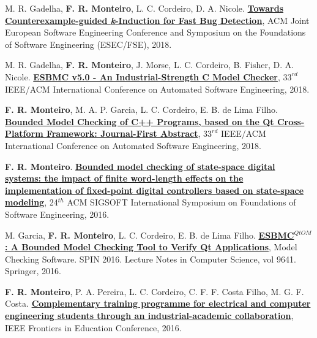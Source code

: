 \documentclass[letterpaper]{article}
\renewenvironment{itemize}{
  \begin{list}{}{
    \setlength{\leftmargin}{1.5em}
  }
}{
  \end{list}
}
\begin{document}
\begin{itemize}
    
    \item M. R. Gadelha, {\bf F. R. Monteiro}, L. C. Cordeiro, D. A. Nicole. \href{https://ssvlab.github.io/lucasccordeiro/papers/fse2018.pdf}{{\bf Towards Counterexample-guided {\emph k}-Induction for Fast Bug Detection}},
   ACM Joint European Software Engineering Conference and Symposium on the Foundations of Software Engineering (ESEC/FSE), 2018.
  
    \item M. R. Gadelha, {\bf F. R. Monteiro}, J. Morse, L. C. Cordeiro, B. Fisher, D. A. Nicole. \href{https://ssvlab.github.io/lucasccordeiro/papers/ase2018.pdf}{{\bf ESBMC v5.0 - An Industrial-Strength C Model Checker}},
  $33^{rd}$ IEEE/ACM International Conference on Automated Software Engineering, 2018.  
        
    \item {\bf F. R. Monteiro}, M. A. P. Garcia, L. C. Cordeiro, E. B. de Lima Filho. \href{https://www.researchgate.net/publication/326657978_Bounded_Model_Checking_of_C_Programs_based_on_the_Qt_Cross-Platform_Framework_Journal-First_Abstract}{{\bf Bounded Model Checking of C++ Programs, based on the Qt Cross-Platform Framework: Journal-First Abstract}},
  $33^{rd}$ IEEE/ACM International Conference on Automated Software Engineering, 2018.  
  
    \item {\bf F. R. Monteiro}. \href{http://dl.acm.org/citation.cfm?id=2983979}{{\bf Bounded model checking of state-space digital systems: the impact of finite word-length effects on the implementation of fixed-point digital controllers based on state-space modeling}},
  24$^{th}$ ACM SIGSOFT International Symposium on Foundations of Software Engineering, 2016.
  
  \item M. Garcia, {\bf F. R. Monteiro}, L. C. Cordeiro, E. B. de Lima Filho. \href{http://link.springer.com/chapter/10.1007/978-3-319-32582-8_6}{{\bf ESBMC$^{QtOM}$: A Bounded Model Checking Tool to Verify Qt Applications}},
  Model Checking Software. SPIN 2016. Lecture Notes in Computer Science, vol 9641. Springer, 2016.

  \item {\bf F. R. Monteiro}, P. A. Pereira, L. C. Cordeiro, C. F. F. Costa Filho, M. G. F. Costa. \href{http://ieeexplore.ieee.org/abstract/document/7757421/}{{\bf Complementary training programme for electrical and computer engineering students through an industrial-academic collaboration}},
  IEEE Frontiers in Education Conference, 2016.
  

\end{itemize}
\end{document}
